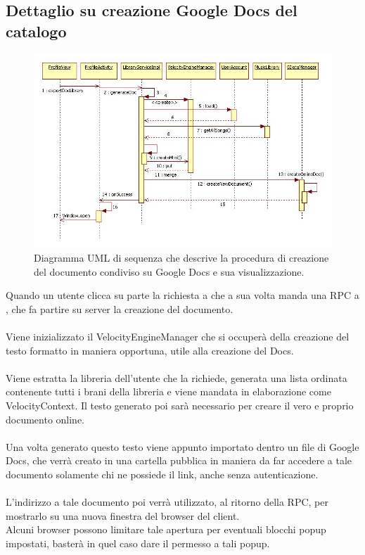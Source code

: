 \newpage
\subsection{Dettaglio su creazione Google Docs del catalogo}

\begin{figure}[!h]
  \centering
  \includegraphics[width=17cm]{img/DP/export_gdocs.png}
\caption{Diagramma UML di sequenza che descrive la procedura di creazione del
documento condiviso su Google Docs e sua visualizzazione.}
\end{figure}

Quando un utente clicca su  parte la richiesta a
 che a sua volta manda una RPC a , che fa
partire su server la creazione del documento.\\\\
Viene inizializzato il VelocityEngineManager che si occuper\`a della creazione
del testo formatto in maniera opportuna, utile alla creazione del Docs.\\\\
Viene estratta la libreria dell'utente che la richiede, generata una lista
ordinata contenente tutti i brani della libreria e viene mandata in elaborazione
come VelocityContext. Il testo generato poi sar\`a necessario per creare il vero
e proprio documento online.\\\\
Una volta generato questo testo viene appunto importato dentro un file di Google
Docs, che verr\`a creato in una cartella pubblica in maniera da far accedere a
tale documento solamente chi ne possiede il link, anche senza
autenticazione.\\\\
L'indirizzo a tale documento poi verr\`a utilizzato, al ritorno della RPC, per
mostrarlo su una nuova finestra del browser del client.\\
Alcuni browser possono limitare tale apertura per eventuali blocchi popup
impostati, baster\`a in quel caso dare il permesso a tali popup.


